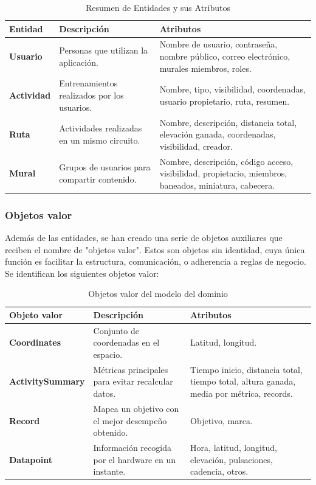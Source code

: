 \begin{table}[h]
\small
\centering
\caption{Resumen de Entidades y sus Atributos}
\begin{tabularx}{\textwidth}{@{} l p{4cm} X @{}}
\toprule
\textbf{Entidad} & \textbf{Descripción} & \textbf{Atributos} \\ \midrule
\textbf{Usuario} & Personas que utilizan la aplicación. & Nombre de usuario, contraseña, nombre público, correo electrónico, murales miembros, roles. \\ \addlinespace
\textbf{Actividad} & Entrenamientos realizados por los usuarios. & Nombre, tipo, visibilidad, coordenadas, usuario propietario, ruta, resumen. \\ \addlinespace
\textbf{Ruta} & Actividades realizadas en un mismo circuito. & Nombre, descripción, distancia total, elevación ganada, coordenadas, visibilidad, creador. \\ \addlinespace
\textbf{Mural} & Grupos de usuarios para compartir contenido. & Nombre, descripción, código acceso, visibilidad, propietario, miembros, baneados, miniatura, cabecera. \\ \bottomrule
\end{tabularx}
\end{table}

\subsubsection{Objetos valor}
Además de las entidades, se han creado una serie de objetos auxiliares que reciben el nombre de "objetos valor". Estos son objetos sin identidad, cuya única función es facilitar la estructura, comunicación, o adherencia a reglas de negocio. Se identifican los siguientes objetos valor:

\begin{table}[h]
\small
\centering
\caption{Objetos valor del modelo del dominio}
\label{tab:objetos_valor}
\begin{tabularx}{\textwidth}{@{} l p{4.5cm} X @{}}
\toprule
\textbf{Objeto valor} & \textbf{Descripción} & \textbf{Atributos} \\ \midrule
\textbf{Coordinates} & Conjunto de coordenadas en el espacio. & Latitud, longitud. \\ \addlinespace
\textbf{ActivitySummary} & Métricas principales para evitar recalcular datos. & Tiempo inicio, distancia total, tiempo total, altura ganada, media por métrica, records. \\ \addlinespace
\textbf{Record} & Mapea un objetivo con el mejor desempeño obtenido. & Objetivo, marca. \\ \addlinespace
\textbf{Datapoint} & Información recogida por el hardware en un instante. & Hora, latitud, longitud, elevación, pulsaciones, cadencia, otros. \\ \bottomrule
\end{tabularx}
\end{table}



